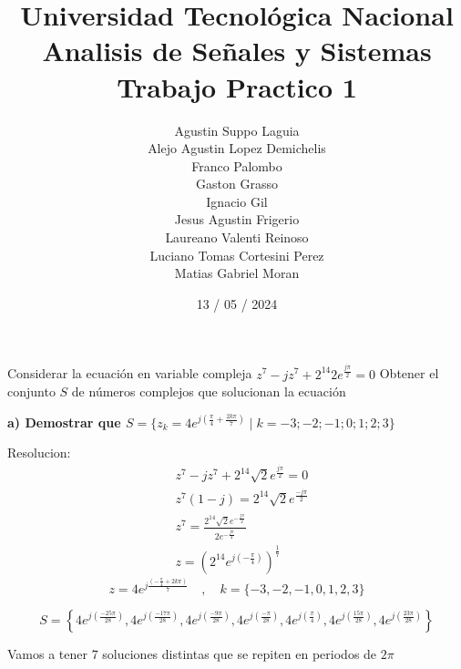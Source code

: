 \documentclass[12pt]{report}
\title{%
  \fontsize{25}{0}\selectfont Universidad Tecnológica Nacional \\
  \fontsize{22}{30}\selectfont Analisis de Señales y Sistemas \\
  \fontsize{20}{25}\selectfont Trabajo Practico 1
}
\author{
Agustin Suppo Laguia\\
Alejo Agustin Lopez Demichelis\\
Franco Palombo\\
Gaston Grasso\\
Ignacio Gil\\
Jesus Agustin Frigerio\\
Laureano Valenti Reinoso\\
Luciano Tomas Cortesini Perez\\
Matias Gabriel Moran\\
}
\date{13 / 05 / 2024}
\begin{document}
\maketitle

\chapter{}%
Considerar la ecuación en variable compleja $z^7-jz^7+2^{14}2e^{\frac{j\pi}{2}}=0$
Obtener el conjunto $S$ de números complejos que solucionan la ecuación

\textbf{a) Demostrar que  $S = \{z_k = 4e^{j(\frac{\pi}{4}+\frac{2k\pi}{7})} \mid k=-3;-2;-1;0;1;2;3\}$}

Resolucion:
\begin{align*}
&z^7 - jz^7 + 2^{14}\sqrt{2}e^{\frac{j\pi}{2}} = 0\\
&z^7(1-j) = 2^{14}\sqrt{2}e^{\frac{-j\pi}{2}}\\
&z^7 = \frac{2^{14}\sqrt{2}e^{-\frac{j\pi}{2}}} {2e^{-\frac{j\pi}{4}}}\\
&z = (2^{14}e^{j(-\frac{\pi} {4})})^{\frac{1}{7}}
\end{align*}
$$z = 4e^{j\frac{(-\frac{\pi}{4}+2k\pi)}{7}} \quad,\quad k = \{-3,-2,-1,0,1,2,3\}$$

$$
S = \left\{ 4e^{j \left( \frac{-25 \pi}{28} \right)}, 4e^{j \left( \frac{-17 \pi}{28} \right)}, 4e^{j \left( \frac{-9 \pi}{28} \right)}, 4e^{j \left( \frac{-\pi}{28} \right)}, 4e^{j \left( \frac{\pi}{4} \right)}, 4e^{j \left( \frac{15 \pi}{28} \right)}, 4e^{j \left( \frac{23 \pi}{28} \right)} \right\}
$$

Vamos a tener 7 soluciones distintas que se repiten en periodos de $2\pi$\\
\end{document}
